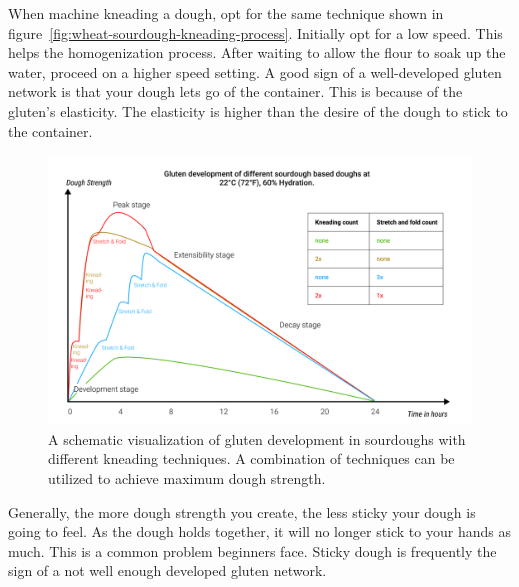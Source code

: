 When machine kneading a dough, opt for the same technique shown in
figure~\ref{fig:wheat-sourdough-kneading-process}.  Initially opt for a low
speed. This helps the homogenization process.
After waiting to allow the flour to soak up the water, proceed on a higher speed
setting. A good sign of a well-developed gluten network is
that your dough lets go of the container. This is because of the gluten's elasticity.
The elasticity is higher than the desire of the
dough to stick to the container.

\begin{figure}[!htb]
  \includegraphics[width=\textwidth]{dough-strength-sourdough}
  \caption[Dough strength over time with kneading]{A schematic visualization
      of gluten development in sourdoughs with different kneading techniques.
      A combination of techniques can be utilized to achieve maximum dough
      strength.}%
  \label{fig:dough-strength-sourdough}
\end{figure}

Generally, the more dough strength you create, the less sticky your dough is going to
feel. As the dough holds together, it will no longer stick to your hands as
much. This is a common problem beginners face. Sticky dough is frequently
the sign of a not well enough developed gluten network.

